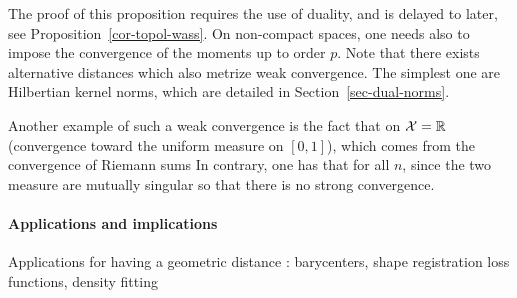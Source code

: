 The proof of this proposition requires the use of duality, and is delayed to later, see Proposition~\ref{cor-topol-wass}. 
On non-compact spaces, one needs also to impose the convergence of the moments up to order $p$.
%
Note that there exists alternative distances which also metrize weak convergence. The simplest one are Hilbertian kernel norms, which are detailed in Section~\ref{sec-dual-norms}.

Another example of such a weak convergence is the fact that on $\mathcal{X}=\mathbb{R}$
(convergence toward the uniform measure on $[0,1]$), which comes from the convergence of Riemann sums 
In contrary, one has that for all $n$, since the two measure are mutually singular
so that there is no strong convergence. 


 
 
\paragraph{Applications and implications}

Applications for having a geometric distance : barycenters, shape registration loss functions, density fitting